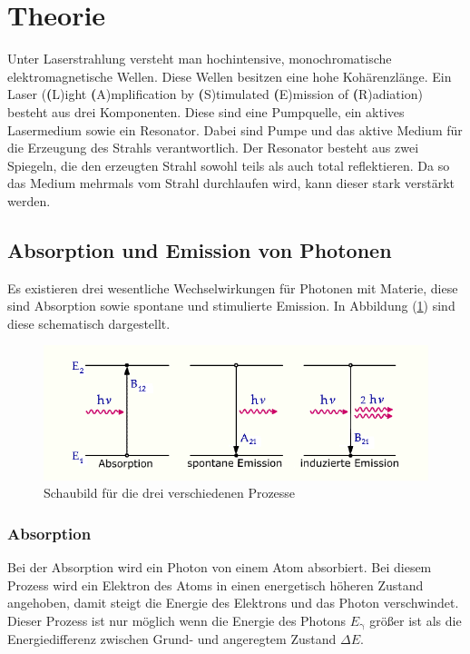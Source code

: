 \section{Theorie}
\label{sec:Theorie}
Unter Laserstrahlung versteht man hochintensive, monochromatische elektromagnetische Wellen. Diese Wellen besitzen eine hohe Kohärenzlänge.
Ein Laser (\textbf(L)ight \textbf(A)mplification by \textbf(S)timulated \textbf(E)mission of \textbf(R)adiation) besteht aus drei Komponenten. Diese sind
eine Pumpquelle, ein aktives Lasermedium sowie ein Resonator. Dabei sind Pumpe und das aktive Medium für die Erzeugung des Strahls verantwortlich. Der Resonator besteht aus zwei Spiegeln, die den erzeugten Strahl sowohl teils als
auch total reflektieren. Da so das Medium mehrmals vom Strahl durchlaufen wird, kann dieser stark verstärkt werden.
\subsection{Absorption und Emission von Photonen}
\label{sec:theorie1}
Es existieren drei wesentliche Wechselwirkungen für Photonen mit Materie, diese sind Absorption sowie spontane und stimulierte Emission.
In Abbildung (\ref{fig:3prozess}) sind diese schematisch dargestellt.
\begin{figure}[h!]
  \centering
  \includegraphics[scale=0.7]{fig/3prozess.png}
  \caption{Schaubild für die drei verschiedenen Prozesse \cite{Anleitung1}}
  \label{fig:3prozess}
\end{figure}
\subsubsection{Absorption}
Bei der Absorption wird ein Photon von einem Atom absorbiert. Bei diesem Prozess wird ein Elektron des Atoms in einen energetisch höheren Zustand angehoben, damit steigt die Energie des Elektrons und das Photon verschwindet.
Dieser Prozess ist nur möglich wenn die Energie des Photons $E_\mathrm{\gamma}$ größer ist als die Energiedifferenz zwischen Grund- und angeregtem Zustand $\Delta E$.
